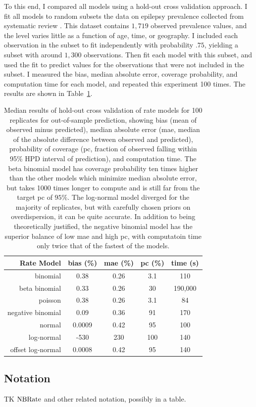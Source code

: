 To this end, I compared all models using a hold-out cross validation
approach.  I fit all models to random subsets the data on epilepsy
prevalence collected from systematic review \cite{TK}.  This dataset
contains $1,719$ observed prevalence values, and the level varies
little as a function of age, time, or geography.  I included each
observation in the subset to fit independently with probability $.75$,
yielding a subset with around $1,300$ observations. Then fit each
model with this subset, and used the fit to predict values for the
observations that were not included in the subset.  I measured the
bias, median absolute error, coverage probability, and computation
time for each model, and repeated this experiment 100 times.  The
results are shown in Table~\ref{rate-comparison}.

\begin{table}
\begin{center}
\begin{tabular}{|r|c|c|c|c|}
\hline
Rate Model       &bias (\%)&mae (\%)&pc (\%)&time (s)\\
\hline
binomial         &0.38     &0.26    &3.1    &110\\
beta binomial    &0.33     &0.26    &30     &190,000\\
poisson          &0.38     &0.26    &3.1    &84\\
negative binomial&0.09     &0.36    &91     &170\\
normal           &0.0009   &0.42    &95     &100\\
log-normal       &-530     &230     &100    &140\\
offset log-normal&0.0008   &0.42    &95     &140\\
\hline
\end{tabular}
\end{center}
\caption{Median results of hold-out cross validation of rate models
  for 100 replicates for out-of-sample prediction, showing bias (mean
  of observed minus predicted), median absolute error (mae, median of
  the absolute difference between observed and predicted), probability
  of coverage (pc, fraction of observed falling within 95\% HPD
  interval of prediction), and computation time.  The beta binomial
  model has coverage probability ten times higher than the other
  models which minimize median absolute error, but takes 1000 times
  longer to compute and is still far from the target pc of $95\%$.
  The log-normal model diverged for the majority of replicates, but
  with carefully chosen priors on overdispersion, it can be quite
  accurate.  In addition to being theoretically justified, the
  negative binomial model has the superior balance of low mae and high
  pc, with computatoin time only twice that of the fastest of the
  models.}
\label{rate-comparison}
\end{table}


\subsection{Notation}
TK $\operatorname{NBRate}$ and other related notation, possibly in a table.

